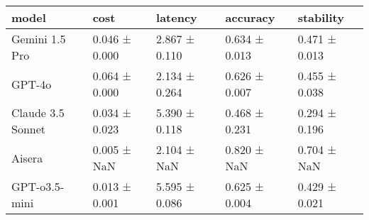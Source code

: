 \begin{tabular}{lllll}
\toprule
model & cost & latency & accuracy & stability \\
\midrule
Gemini 1.5 Pro & 0.046 ± 0.000 & 2.867 ± 0.110 & 0.634 ± 0.013 & 0.471 ± 0.013 \\
GPT-4o & 0.064 ± 0.000 & 2.134 ± 0.264 & 0.626 ± 0.007 & 0.455 ± 0.038 \\
Claude 3.5 Sonnet & 0.034 ± 0.023 & 5.390 ± 0.118 & 0.468 ± 0.231 & 0.294 ± 0.196 \\
Aisera & 0.005 ± NaN & 2.104 ± NaN & 0.820 ± NaN & 0.704 ± NaN \\
GPT-o3.5-mini & 0.013 ± 0.001 & 5.595 ± 0.086 & 0.625 ± 0.004 & 0.429 ± 0.021 \\
\bottomrule
\end{tabular}
